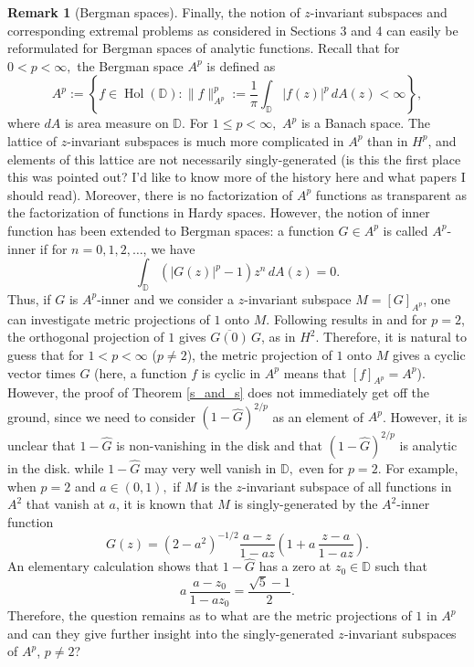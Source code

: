 \documentclass{article}
\theoremstyle{plain}
\numberwithin{Theorem}{section}
\numberwithin{equation}{section}
\theoremstyle{plain}
\theoremstyle{definition}
\newtheorem{Remark}[Theorem]{Remark}
\renewcommand{\leq}{\leqslant}
\newcommand{\D}{\mathbb{D}}
\newcommand{\chris}[1]{{\color{Plum}#1}}
\begin{document}
\iffalse
{\color{cyan}
\begin{Remark}[Bergman spaces]
Finally, the notion of $z$-invariant subspaces and corresponding extremal problems as considered in Sections 3 and 4 can easily be reformulated for Bergman spaces of analytic functions.  Recall that for $ 0 < p < \infty,$ the Bergman space $A^p$ is defined as
\begin{equation*}
    A^p := \left\{ f\in \operatorname{Hol}(\D) : 
    \|f\|_{A^p}^p := \frac{1}{\pi} \int_{\D} |f(z)|^p\, dA(z) < \infty \right\},
\end{equation*}
where $dA$ is area measure on $\D$. For $1 \leq p < \infty,$ $A^p$ is a Banach space. The lattice of $z$-invariant subspaces is much more complicated in $A^p$ than in $H^p$, and elements of this lattice are not necessarily singly-generated \cite{DuSchu} \chris{(is this the first place this was pointed out? I'd like to know more of the history here and what papers I should read)}. Moreover, there is no factorization of $A^p$ functions as transparent as the factorization of functions in Hardy spaces. However, the notion of inner function has been extended to Bergman spaces: a function $G \in A^p$ is called $A^p$-inner if for $n = 0, 1, 2, \ldots$, we have 
\begin{equation*}
    \int_{\D} \left(|G(z)|^{p} -1 \right) z^ n \, dA(z) = 0.
\end{equation*}
Thus, if $G$ is $A^p$-inner and we consider a $z$-invariant subspace $M = [G]_{A^p}$, one can investigate metric projections of $1$ onto $M$. Following results in \cite{BFKSS} and \cite{Felder} for $p = 2$, the orthogonal projection of $1$ gives $\overline{G(0)}\, G$, as in $H^2$. Therefore, it is natural to guess that for $1 < p < \infty$ ($p \neq 2$), the metric projection of $1$ onto $M$ gives a cyclic vector times $G$ (here, a function $f$ is cyclic in $A^p$ means that $[f]_{A^p} = A^p$). However, the proof of Theorem \ref{s_and_s} does not immediately get off the ground, since we need to consider  $\left( 1 - \hat{G} \right)^{2/p}$ as an element of $A^p$. However, it is unclear that $1 - \hat{G}$ is non-vanishing in the disk and that $\left( 1 - \hat{G} \right)^{2/p}$ is analytic in the disk.  while $1 - \hat{G}$ may very well vanish in $\D,$ even for $p = 2$. For example, when $p=2$ and $a \in (0,1),$ if $M$ is the $z$-invariant subspace of all functions in $A^2$ that vanish at $a$, it is known \cite[p.\ 125]{DuSchu} that $M$ is singly-generated by the $A^2$-inner function 
\begin{equation*}
    G(z) = (2 - a^2)^{-1/2} \frac{a-z}{1-a z} \left( 1 + a \, \frac{z-a}{1-a z} \right).
\end{equation*}
An elementary calculation shows that $1 - \hat{G}$ has a zero at $z_0 \in \D$ such that
\begin{equation*}
    a \, \frac{a-z_0}{1-a z_0} = \frac{\sqrt{5} -1}{2}.
\end{equation*}
Therefore, the question remains as to what are the metric projections of $1$ in $A^p$ and can they give further insight into the singly-generated $z$-invariant subspaces of $A^p$, $p \neq 2$?


\end{Remark}}
\end{document}

